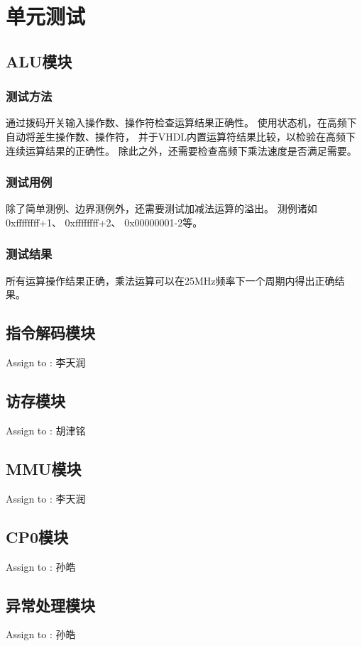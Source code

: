 \section{单元测试}


    \subsection{ALU模块}


        \subsubsection{测试方法}
            通过拨码开关输入操作数、操作符检查运算结果正确性。%
            使用状态机，在高频下自动将差生操作数、操作符，%
            并于VHDL内置运算符结果比较，以检验在高频下连续运算结果的正确性。%
            除此之外，还需要检查高频下乘法速度是否满足需要。

        \subsubsection{测试用例}
            除了简单测例、边界测例外，还需要测试加减法运算的溢出。
            测例诸如%
            0xffffffff+1、%
            0xffffffff+2、%
            0x00000001-2等。

        \subsubsection{测试结果}
            所有运算操作结果正确，乘法运算可以在25MHz频率下一个周期内得出正确结果。

    \subsection{指令解码模块}
        Assign to : 李天润

    \subsection{访存模块}
        Assign to : 胡津铭

    \subsection{MMU模块}
        Assign to  : 李天润

    \subsection{CP0模块}
        Assign to  : 孙皓

    \subsection{异常处理模块}
        Assign to  : 孙皓
